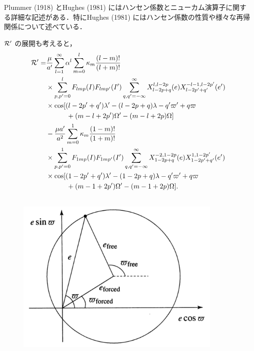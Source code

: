 \documentclass[11pt,a4paper,oneside,onecolumn]{jarticle}
\begin{document}
Plummer (1918) とHughes (1981) にはハンセン係数とニューカム演算子に関する詳細な記述がある．特にHughes (1981) にはハンセン係数の性質や様々な再帰関係について述べている．

${\cal R'}$ の展開も考えると，
\begin{equation}
\begin{split}
{\cal R'} = & \frac{\mu}{a'} \sum_{l = 1}^{\infty} \alpha^l \sum_{m = 0}^l \kappa_m \frac{(l - m) !}{(l + m) !} \\
& \times \sum_{p,p' = 0}^l F_{lmp} (I) F_{lmp'} (I') \sum_{q,q' = - \infty}^{\infty} X_{l - 2p + q}^{l, l - 2p} (e) X_{l - 2p' + q'}^{-l -1, l - 2p'} (e') \\
& \times \cos [ (l - 2p' + q') \lambda' - (l - 2p + q) \lambda - q' \varpi' + q \varpi \\
& \quad \quad \quad + (m - l + 2p') \Omega' - (m - l + 2p) \Omega ] \\
& - \frac{\mu a'}{a^2} \sum_{m = 0}^1 \kappa_m \frac{(1 - m) !}{(1 + m) !} \\
& \times \sum_{p,p' = 0}^1 F_{1mp} (I) F_{1mp'} (I') \sum_{q,q' = - \infty}^{\infty} X_{1 - 2p + q}^{-2, 1 - 2p} (e) X_{1 - 2p' + q'}^{1, 1 - 2p'} (e') \\
& \times \cos [ (1 - 2p' +q') \lambda' - (1 -2p + q) \lambda - q' \varpi' +q \varpi \\
& \quad \quad \quad + (m - 1 + 2p') \Omega' - (m - 1 + 2p) \Omega ].
\end{split}
\end{equation}

\subsection{}












\begin{figure}[H]
\centering
\includegraphics[width=10cm]{./image/sec7_2.pdf}
\caption{\label{}}
\end{figure}
\end{document}

